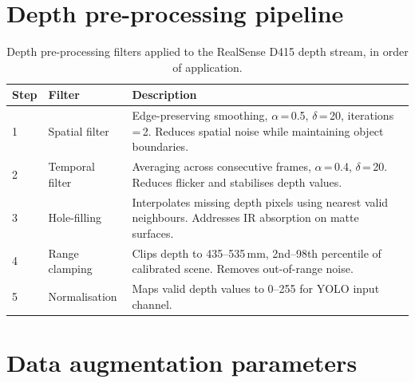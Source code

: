 \documentclass{Academic}
\begin{document}
\begin{appendices}
\section{Depth pre-processing pipeline}
\label{app:preprocessing}

\begin{table}[H]
  \centering
  \begin{tabular}{llp{6cm}}
    \toprule
    \textbf{Step} & \textbf{Filter} & \textbf{Description} \\
    \midrule
    1 & Spatial filter     & Edge-preserving smoothing, $\alpha$\,=\,0.5, $\delta$\,=\,20, iterations\,=\,2. Reduces spatial noise while maintaining object boundaries. \\
    2 & Temporal filter    & Averaging across consecutive frames, $\alpha$\,=\,0.4, $\delta$\,=\,20. Reduces flicker and stabilises depth values. \\
    3 & Hole-filling       & Interpolates missing depth pixels using nearest valid neighbours. Addresses IR absorption on matte surfaces. \\
    4 & Range clamping     & Clips depth to 435--535\,mm, 2nd--98th percentile of calibrated scene. Removes out-of-range noise. \\
    5 & Normalisation      & Maps valid depth values to 0--255 for YOLO input channel. \\
    \bottomrule
  \end{tabular}
  \caption{Depth pre-processing filters applied to the RealSense D415 depth stream, in order of application.}
\end{table}

\section{Data augmentation parameters}
\label{app:augmentation}


\end{appendices}
\end{document}
